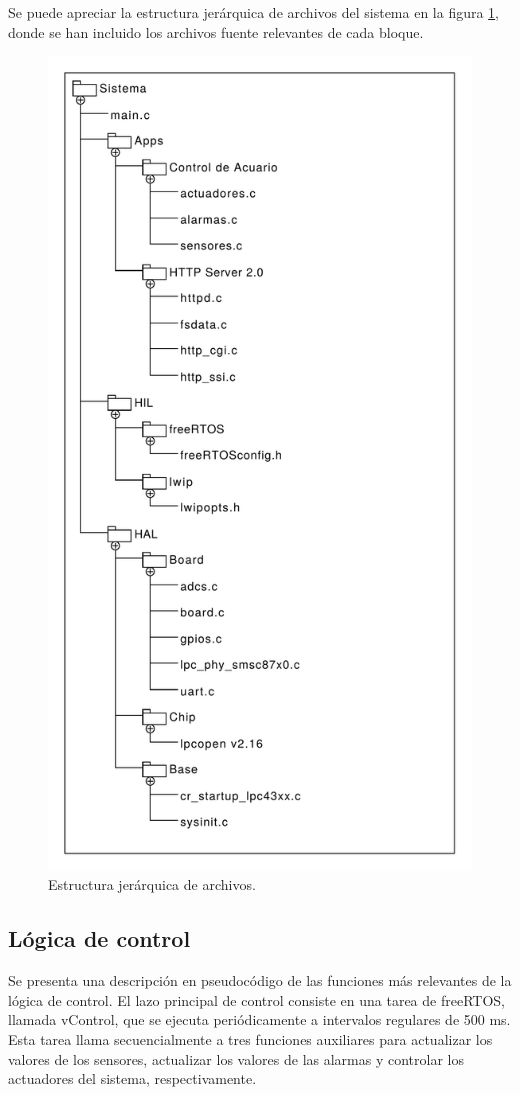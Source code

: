 Se puede apreciar la estructura jerárquica de archivos del sistema en la figura \ref{fig:estructura}, donde se han incluido los archivos fuente relevantes de cada bloque.

\begin{figure}[htp]
	\centering
    \includegraphics[width=.68\textwidth]{./Figures/diagramaUML.pdf}
	\caption{Estructura jerárquica de archivos.}
	\label{fig:estructura}
\end{figure}

\subsection{Lógica de control}

Se presenta una descripción en pseudocódigo de las funciones más relevantes de la lógica de control.  El lazo principal de control consiste en una tarea de freeRTOS, llamada vControl, que se ejecuta periódicamente a intervalos regulares de 500 ms.  Esta tarea llama secuencialmente a tres funciones auxiliares para actualizar los valores de los sensores, actualizar los valores de las alarmas y controlar los actuadores del sistema, respectivamente.

